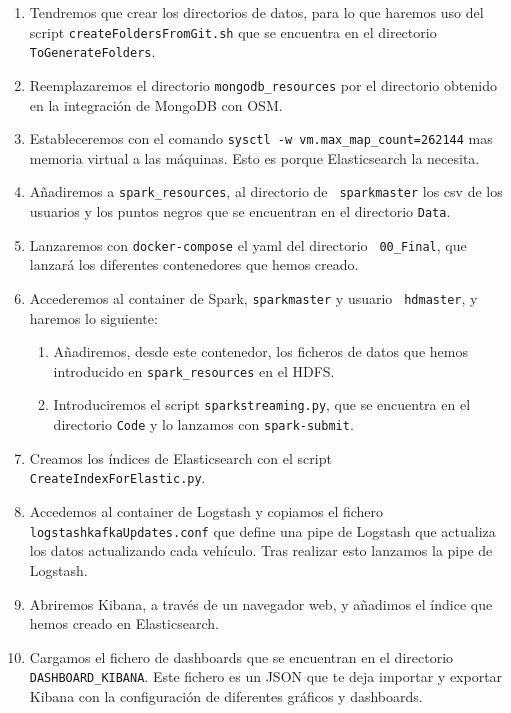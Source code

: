 \begin{enumerate}
\item Tendremos que crear los directorios de datos, para lo que haremos uso
  del script {\tt createFoldersFromGit.sh} que se encuentra en el
  directorio {\tt ToGenerateFolders}.
\item Reemplazaremos el directorio {\tt mongodb\_resources} por el
  directorio obtenido en la integración de MongoDB con OSM.
\item Estableceremos con el comando {\tt sysctl -w
    vm.max\_map\_count=262144} mas memoria virtual a las máquinas. Esto es
  porque Elasticsearch la necesita.
\item Añadiremos a {\tt spark\_resources}, al directorio de {\tt
    sparkmaster} los csv de los usuarios y los puntos negros que se
  encuentran en el directorio {\tt Data}.
\item Lanzaremos con {\tt docker-compose} el yaml del directorio {\tt
    00\_Final}, que lanzará los diferentes contenedores que hemos creado.
\item Accederemos al container de Spark, {\tt sparkmaster} y usuario {\tt
    hdmaster}, y haremos lo siguiente:
\begin{enumerate}
\item Añadiremos, desde este contenedor, los ficheros de datos que hemos
  introducido en {\tt spark\_resources} en el HDFS.
\item Introduciremos el script {\tt sparkstreaming.py}, que se encuentra en
  el directorio {\tt Code} y lo lanzamos con {\tt spark-submit}.
\end{enumerate}
\item Creamos los índices de Elasticsearch con el script {\tt
    CreateIndexForElastic.py}.
\item Accedemos al container de Logstash y copiamos el fichero {\tt
    logstashkafkaUpdates.conf} que define una pipe de Logstash que
  actualiza los datos actualizando cada vehículo. Tras realizar esto
  lanzamos la pipe de Logstash.
\item Abriremos Kibana, a través de un navegador web, y añadimos el índice
  que hemos creado en Elasticsearch.
\item Cargamos el fichero de dashboards que se encuentran en el directorio
  {\tt DASHBOARD\_KIBANA}. Este fichero es un JSON que te deja importar y
  exportar Kibana con la configuración de diferentes gráficos y dashboards.
\end{enumerate}

